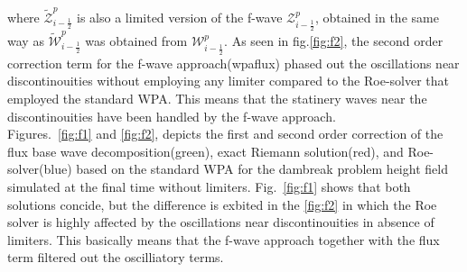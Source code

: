\documentclass[12pt,a4paper]{article}
\begin{document}
	\noindent where $ \tilde{\mathcal{Z}}_{i-\frac{1}{2}}^{p} $ is also a limited version of the f-wave $ \mathcal{Z}_{i-\frac{1}{2}}^{p} $, obtained in the same way as $ \tilde{\mathcal{W}}_{i-\frac{1}{2}}^{p}$ was obtained from $ \mathcal{W}_{i-\frac{1}{2}}^{p}$. As seen in fig.\ref{fig:f2}, the second order correction term for the f-wave approach(wpa\textunderscore flux) phased out the oscillations near discontinouities without employing any limiter compared to the Roe-solver that employed the standard WPA. This means that the statinery waves near the discontinouities have been handled by the f-wave approach.\\
	
	\noindent Figures.~\ref{fig:f1} and \ref{fig:f2}, depicts the first and second order correction of the flux base wave decomposition(green), exact Riemann solution(red), and Roe-solver(blue) based on the standard WPA for the dambreak problem height field simulated at the final time without limiters. Fig.~\ref{fig:f1}  shows that both solutions concide, but the difference is exbited in the \ref{fig:f2} in which the Roe solver is highly affected by the oscillations near discontinouities in absence of limiters. This basically means that the f-wave approach together with the flux term filtered out the oscilliatory terms.
\end{document}
